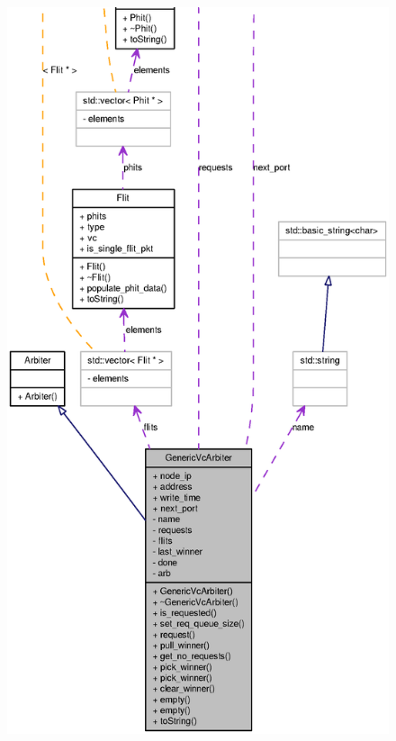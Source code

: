 \begin{figure}[H]
\begin{center}
\leavevmode
\includegraphics[width=400pt]{classGenericVcArbiter__coll__graph}
\end{center}
\end{figure}
